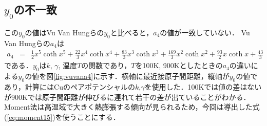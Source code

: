 \subsection{$y_0$の不一致}
この$y_0$の値はVu Van Hungらの$y_0$と比べると，$a_4$の値が一致していない．
Vu Van Hungらの$a_4$は
\begin{eqnarray}
\label{eq:vua4}
a_4&=&
\frac{1}{2}x^5 \coth x^5
+\frac{22}{3}x^4 \coth x^4
+\frac{83}{3}x^3 \coth x^3
+\frac{169}{3}x^2 \coth x^2
+\frac{93}{2}x \coth x
+\frac{43}{3}\nonumber
\end{eqnarray}
である．$y_0$は$k$, $\gamma$, 温度$T$の関数であり，$T$を100K, 900Kとしたときの$a_4$の違いによる$y_0$の値を図\ref{fig:vuvana4}に示す．横軸に最近接原子間距離，縦軸が$y_0$の値であり，計算にはCuのペアポテンシャルの$k$,$\gamma$を使用した．100Kでは値の差はないが900Kでは原子間距離が伸びるに連れて若干の差が出ていることがわかる．Moment法は高温域で大きく熱膨張する傾向が見られるため，今回は導出した式(\ref{eq:moment15})を使うことにする．

